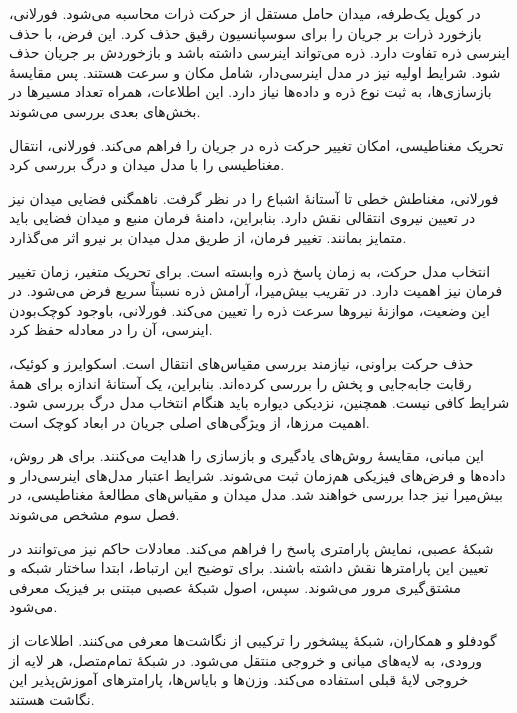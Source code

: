 در کوپل یک‌طرفه، میدان حامل مستقل از حرکت ذرات محاسبه می‌شود.
فورلانی، بازخورد ذرات بر جریان را برای سوسپانسیون رقیق حذف کرد.
\cite{Furlani2006Transport}
این فرض، با حذف اینرسی ذره تفاوت دارد.
ذره می‌تواند اینرسی داشته باشد و بازخوردش بر جریان حذف شود.
شرایط اولیه نیز در مدل اینرسی‌دار، شامل مکان و سرعت هستند.
\cite{ProvencherLanglois2015}
پس مقایسهٔ بازسازی‌ها، به ثبت نوع ذره و داده‌ها نیاز دارد.
این اطلاعات، همراه تعداد مسیرها در بخش‌های بعدی بررسی می‌شوند.

\label{sec:lit-magnetic-particle}

تحریک مغناطیسی، امکان تغییر حرکت ذره در جریان را فراهم می‌کند.
فورلانی، انتقال مغناطیسی را با مدل میدان و درگ بررسی کرد.
\cite{Furlani2006Transport}

فورلانی، مغناطش خطی تا آستانهٔ اشباع را در نظر گرفت.
ناهمگنی فضایی میدان نیز در تعیین نیروی انتقالی نقش دارد.
\cite{Furlani2006Transport}
بنابراین، دامنهٔ فرمان منبع و میدان فضایی باید متمایز بمانند.
تغییر فرمان، از طریق مدل میدان بر نیرو اثر می‌گذارد.

انتخاب مدل حرکت، به زمان پاسخ ذره وابسته است.
برای تحریک متغیر، زمان تغییر فرمان نیز اهمیت دارد.
در تقریب بیش‌میرا، آرامش ذره نسبتاً سریع فرض می‌شود.
در این وضعیت، موازنهٔ نیروها سرعت ذره را تعیین می‌کند.
فورلانی، باوجود کوچک‌بودن اینرسی، آن را در معادله حفظ کرد.
\cite{Furlani2006Transport}

حذف حرکت براونی، نیازمند بررسی مقیاس‌های انتقال است.
اسکوایرز و کوئیک، رقابت جابه‌جایی و پخش را بررسی کرده‌اند.
\cite{SquiresQuake2005}
بنابراین، یک آستانهٔ اندازه برای همهٔ شرایط کافی نیست.
همچنین، نزدیکی دیواره باید هنگام انتخاب مدل درگ بررسی شود.
اهمیت مرزها، از ویژگی‌های اصلی جریان در ابعاد کوچک است.
\cite{SquiresQuake2005}

این مبانی، مقایسهٔ روش‌های یادگیری و بازسازی را هدایت می‌کنند.
برای هر روش، داده‌ها و فرض‌های فیزیکی هم‌زمان ثبت می‌شوند.
شرایط اعتبار مدل‌های اینرسی‌دار و بیش‌میرا نیز جدا بررسی خواهند شد.
مدل میدان و مقیاس‌های مطالعهٔ مغناطیسی، در فصل سوم مشخص می‌شوند.

\label{sec:lit-pinn}

شبکهٔ عصبی، نمایش پارامتری پاسخ را فراهم می‌کند.
معادلات حاکم نیز می‌توانند در تعیین این پارامترها نقش داشته باشند.
برای توضیح این ارتباط، ابتدا ساختار شبکه و مشتق‌گیری مرور می‌شوند.
سپس، اصول شبکهٔ عصبی مبتنی بر فیزیک معرفی می‌شود.

\label{sec:lit-feedforward-autodiff}

گودفلو و همکاران، شبکهٔ پیشخور را ترکیبی از نگاشت‌ها معرفی می‌کنند.
اطلاعات از ورودی، به لایه‌های میانی و خروجی منتقل می‌شود.
در شبکهٔ تمام‌متصل، هر لایه از خروجی لایهٔ قبلی استفاده می‌کند.
وزن‌ها و بایاس‌ها، پارامترهای آموزش‌پذیر این نگاشت هستند.
\cite{Goodfellow2016}

